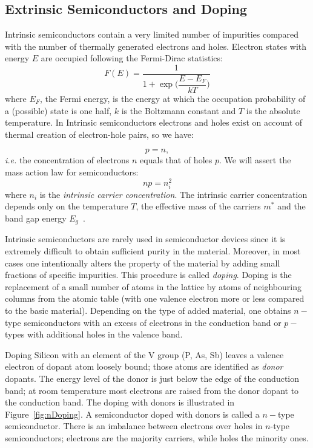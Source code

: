 \subsection{Extrinsic Semiconductors and Doping}

Intrinsic semiconductors contain a very limited number of impurities  compared with the number of 
thermally generated electrons and holes. 
Electron states with energy $E$ are occupied following the Fermi-Dirac statistics:
\begin{equation}
F(E)=\dfrac{1}{1+\exp{\Bigg(\dfrac{E-E_F}{kT}}\Bigg)}
\label{eq:FermiDirac}	
\end{equation}
where $E_F$, the Fermi energy, is the energy at which the occupation probability of a (possible) 
state is one half, $k$ is the Boltzmann constant and $T$ is the absolute temperature. 
In Intrinsic semiconductors electrons and holes exist on account of thermal creation of electron-hole 
pairs, so we have:

\begin{equation}
p=n,
\label{eq:n=p}
\end{equation}
{\it i.e.} the concentration of electrons $n$ equals that of holes $p$. 
We will assert the mass action law for semiconductors:
\begin{equation}
np=n_i^2
\label{eq:massLawAction}
\end{equation} 
where $n_i$ is the {\it intrinsic carrier concentration}. The intrinsic carrier concentration depends only 
on the temperature $T$, the effective mass of the carriers $m^*$ 
and the band gap energy 
$E_g$~\cite{Lutz:411172}.


Intrinsic semiconductors are rarely used in semiconductor 
devices since it is extremely difficult to obtain sufficient purity in the material. Moreover, in most cases 
one intentionally alters the property of the material by adding small fractions of specific impurities. 
This procedure is called {\it doping}. 
 Doping is the replacement of a small number of atoms in the lattice by 
atoms of neighbouring columns from the atomic table (with one valence electron more or less compared 
to the basic material). Depending on the type of added material, one obtains $n-$type 
semiconductors with an excess of electrons in the conduction band or $p-$types with additional holes in 
the valence band. 

Doping Silicon with an element of the V group (P, As, Sb) leaves a valence electron of dopant atom 
loosely bound; those atoms are identified  
as {\it donor} dopants. The energy level of the donor is just below the edge of the conduction band; 
at room temperature most electrons are raised from the donor dopant to the conduction band.  
The doping with donors  is illustrated in Figure~\ref{fig:nDoping}. A semiconductor doped with 
donors is called a $n-$type semiconductor. There is an imbalance between 
electrons over holes in $n$-type semiconductors; electrons are the majority carriers, while holes the
minority ones. 

